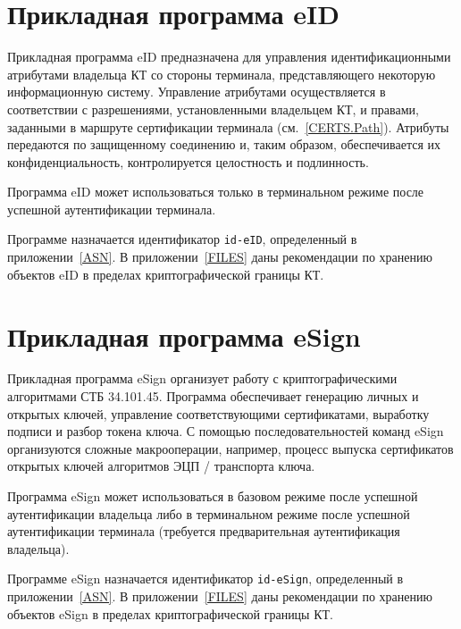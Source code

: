 \section{Прикладная программа eID}\label{OBJ.eID}

Прикладная программа eID предназначена для управления идентификационными
атрибутами владельца КТ со стороны терминала, представляющего некоторую
информационную систему.
%
Управление атрибутами осуществляется в соответствии с разрешениями,
установленными владельцем КТ, и правами, заданными в маршруте сертификации
терминала (см.~\ref{CERTS.Path}).
%
Атрибуты передаются по защищенному соединению и, таким образом, обеспечивается 
их конфиденциальность, контролируется целостность и подлинность. 

Программа eID может использоваться только в терминальном режиме
после успешной аутентификации терминала. 

Программе назначается идентификатор \verb|id-eID|, определенный в
приложении~\ref{ASN}. В приложении~\ref{FILES} даны рекомендации по хранению
объектов eID в пределах криптографической границы КТ.

\section{Прикладная программа eSign}\label{OBJ.eSign}

Прикладная программа eSign организует работу с криптографическими 
алгоритмами СТБ 34.101.45. 
%
Программа обеспечивает генерацию личных и открытых 
ключей, управление соответствующими сертификатами, 
выработку подписи и разбор токена ключа.
%
С помощью последовательностей команд eSign организуются сложные макрооперации,  
например, процесс выпуска сертификатов открытых ключей алгоритмов ЭЦП / 
транспорта ключа. 

Программа eSign может использоваться в базовом режиме 
после успешной аутентификации владельца либо в терминальном режиме 
после успешной аутентификации терминала (требуется предварительная 
аутентификация владельца). 


Программе eSign назначается идентификатор \verb|id-eSign|, 
определенный в приложении~\ref{ASN}. В приложении~\ref{FILES}
даны рекомендации по хранению объектов eSign в пределах криптографической 
границы КТ.




